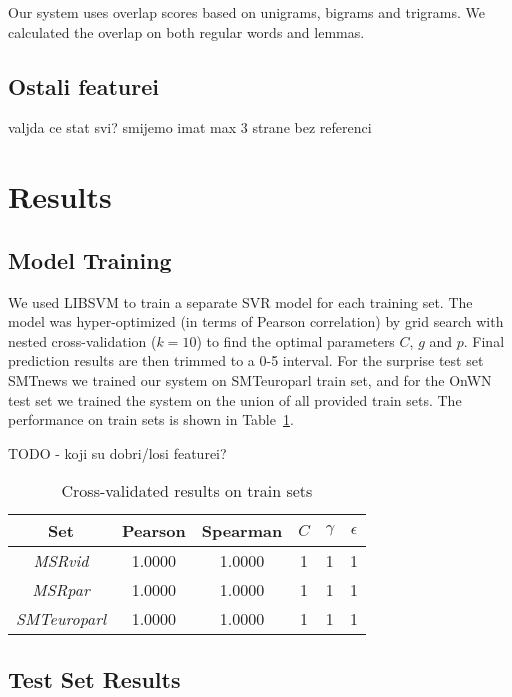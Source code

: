 \documentclass[10pt, a4paper]{article}
\begin{document}
Our system uses overlap scores based on unigrams, bigrams and trigrams. We calculated the overlap on both regular words and lemmas.

\subsection{Ostali featurei}

valjda ce stat svi? smijemo imat max 3 strane bez referenci

\section{Results}

\subsection{Model Training}

We used LIBSVM \citep{chang2011libsvm} to train a separate SVR model for each training set. The model was hyper-optimized (in terms of Pearson correlation) by grid search with nested cross-validation ($k=10$) to find the optimal parameters $C$, $g$ and $p$. Final prediction results are then trimmed to a 0-5 interval. For the surprise test set SMTnews we trained our system on SMTeuroparl train set, and for the OnWN test set we trained the system on the union of all provided train sets. The performance on train sets is shown in Table~\ref{tab:train-results-table}.

TODO - koji su dobri/losi featurei?

\begin{table}[h]
\caption{Cross-validated results on train sets}
\label{tab:train-results-table}
\begin{center}
\begin{tabular}{cccccc}
\toprule
Set & Pearson & Spearman & $C$ & $\gamma$ & $\epsilon$ \\
\midrule
\textit{MSRvid} & 1.0000 & 1.0000 & 1 & 1 & 1 \\
\textit{MSRpar} & 1.0000 & 1.0000 & 1 & 1 & 1 \\
\textit{SMTeuroparl} & 1.0000 & 1.0000 & 1 & 1 & 1 \\
\bottomrule
\end{tabular}
\end{center}
\end{table}

\subsection{Test Set Results}
\end{document}
